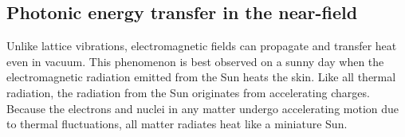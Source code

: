 







\subsection{Photonic energy transfer in the near-field}
\label{sec:intro_em}

Unlike lattice vibrations, electromagnetic fields can propagate and transfer heat even in vacuum. This phenomenon is best observed on a sunny day when the electromagnetic radiation emitted from the Sun heats the skin. Like all thermal radiation, the radiation from the Sun originates from accelerating charges. Because the electrons and nuclei in any matter undergo accelerating motion due to thermal fluctuations, all matter radiates heat like a miniature Sun. 


